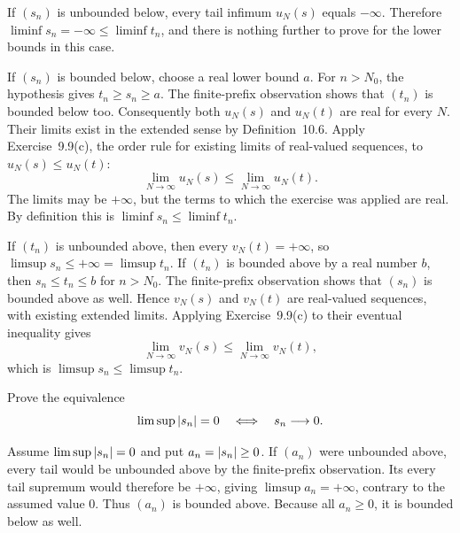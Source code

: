 If $(s_n)$ is unbounded below, every tail infimum $u_N(s)$ equals
$-\infty$. Therefore $\liminf s_n=-\infty\le\liminf t_n$, and
there is nothing further to prove for the lower bounds in this case.

If $(s_n)$ is bounded below, choose a real lower bound $a$.
For $n>N_0$, the hypothesis gives $t_n\ge s_n\ge a$. The
finite-prefix observation shows that $(t_n)$ is bounded below too.
Consequently both $u_N(s)$ and $u_N(t)$ are real for every $N$.
Their limits exist in the extended sense by Definition~10.6.
Apply Exercise~9.9(c), the order rule for existing limits of
real-valued sequences, to $u_N(s)\le u_N(t)$:
\[
 \lim_{N\to\infty}u_N(s)\le\lim_{N\to\infty}u_N(t).
\]
The limits may be $+\infty$, but the terms to which the exercise
was applied are real. By definition this is
$\liminf s_n\le\liminf t_n$.

If $(t_n)$ is unbounded above, then every $v_N(t)=+\infty$, so
$\limsup s_n\le+\infty=\limsup t_n$.
If $(t_n)$ is bounded above by a real number $b$, then
$s_n\le t_n\le b$ for $n>N_0$. The finite-prefix observation
shows that $(s_n)$ is bounded above as well. Hence $v_N(s)$ and
$v_N(t)$ are real-valued sequences, with existing extended limits.
Applying Exercise~9.9(c) to their eventual inequality gives
\[
 \lim_{N\to\infty}v_N(s)\le\lim_{N\to\infty}v_N(t),
\]
which is $\limsup s_n\le\limsup t_n$.



\goal Prove the equivalence
\[
 \limsup\left|s_n\right|=0\quad\Longleftrightarrow\quad s_n\longrightarrow0.
\]

Assume $\limsup\left|s_n\right|=0$ and put $a_n=\left|s_n\right|\ge0$.
If $(a_n)$ were unbounded above, every tail would be unbounded above
by the finite-prefix observation. Its every tail supremum would
therefore be $+\infty$, giving $\limsup a_n=+\infty$, contrary to
the assumed value $0$. Thus $(a_n)$ is bounded above.
Because all $a_n\ge0$, it is bounded below as well.

